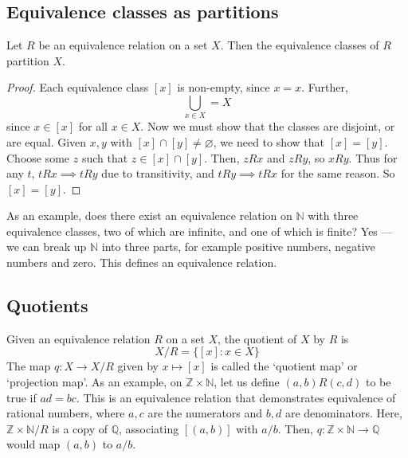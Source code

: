 \subsection{Equivalence classes as partitions}
\begin{proposition}
	Let \(R\) be an equivalence relation on a set \(X\).
	Then the equivalence classes of \(R\) partition \(X\).
\end{proposition}
\begin{proof}
	Each equivalence class \([x]\) is non-empty, since \(x = x\).
	Further,
	\[
		\bigcup_{x \in X} = X
	\]
	since \(x \in [x]\) for all \(x \in X\).
	Now we must show that the classes are disjoint, or are equal.
	Given \(x, y\) with \([x] \cap [y] \neq \varnothing\), we need to show that \([x] = [y]\).
	Choose some \(z\) such that \(z \in [x] \cap [y]\).
	Then, \(zRx\) and \(zRy\), so \(xRy\).
	Thus for any \(t\), \(tRx \implies tRy\) due to transitivity, and \(tRy \implies tRx\) for the same reason.
	So \([x] = [y]\).
\end{proof}
As an example, does there exist an equivalence relation on \(\mathbb N\) with three equivalence classes, two of which are infinite, and one of which is finite?
Yes --- we can break up \(\mathbb N\) into three parts, for example positive numbers, negative numbers and zero.
This defines an equivalence relation.

\subsection{Quotients}
Given an equivalence relation \(R\) on a set \(X\), the quotient of \(X\) by \(R\) is
\[
	X/R = \{ [x]: x \in X \}
\]
The map \(q\colon X\to X/R\) given by \(x \mapsto [x]\) is called the `quotient map' or `projection map'.
As an example, on \(\mathbb Z \times \mathbb N\), let us define \((a, b)R(c, d)\) to be true if \(ad=bc\).
This is an equivalence relation that demonstrates equivalence of rational numbers, where \(a, c\) are the numerators and \(b, d\) are denominators.
Here, \(\mathbb Z \times \mathbb N / R\) is a copy of \(\mathbb Q\), associating \([(a, b)]\) with \(a/b\).
Then, \(q\colon \mathbb Z \times \mathbb N \to \mathbb Q\) would map \((a, b)\) to \(a/b\).

